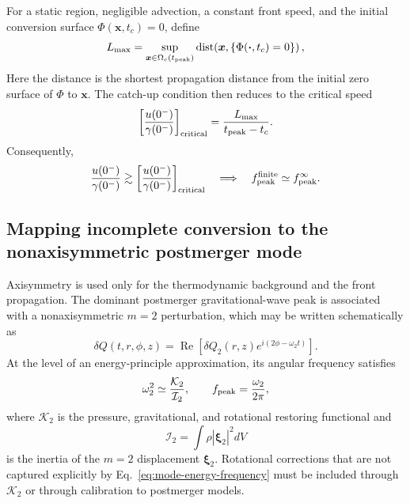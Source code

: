 \documentclass[11pt]{article}
\begin{document}
For a static region, negligible advection, a constant front speed, and the initial conversion surface \(\Phi(\boldsymbol{x},t_c)=0\), define
\begin{equation}
L_{\rm max}
=
\sup_{\boldsymbol{x}\in\Omega_c(t_{\rm peak})}
\operatorname{dist}\!\left(\boldsymbol{x},\{\Phi(\boldsymbol{\cdot},t_c)=0\}\right),
\label{eq:maximum-propagation-distance}
\end{equation}
Here the distance is the shortest propagation distance from the initial zero surface of \(\Phi\) to \(\boldsymbol{x}\).
The catch-up condition then reduces to the critical speed
\begin{equation}
\left[
\frac{u(0^-)}
{\gamma(0^-)}
\right]_{\rm critical}
=
\frac{L_{\rm max}}
{t_{\rm peak}-t_c}.
\label{eq:generic-critical-front-velocity}
\end{equation}
Consequently,
\begin{equation}
\frac{u(0^-)}
{\gamma(0^-)}
\gtrsim
\left[
\frac{u(0^-)}
{\gamma(0^-)}
\right]_{\rm critical}
\quad\Longrightarrow\quad
f_{\rm peak}^{\rm finite}
\simeq
f_{\rm peak}^{\infty}.
\label{eq:generic-frequency-catch-up}
\end{equation}

\subsection{Mapping incomplete conversion to the nonaxisymmetric postmerger mode}
\label{sec:gw-frequency-map}

Axisymmetry is used only for the thermodynamic background and the front propagation.
The dominant postmerger gravitational-wave peak is associated with a nonaxisymmetric \(m=2\) perturbation, which may be written schematically as
\begin{equation}
\delta Q(t,r,\phi,z)
=
\operatorname{Re}
\left[
\delta Q_2(r,z)
e^{i(2\phi-\omega_2 t)}
\right].
\label{eq:m2-perturbation}
\end{equation}
At the level of an energy-principle approximation, its angular frequency satisfies
\begin{equation}
\omega_2^2
\simeq
\frac{\mathcal K_2}{\mathcal I_2},
\qquad
f_{\rm peak}
=
\frac{\omega_2}{2\pi},
\label{eq:mode-energy-frequency}
\end{equation}
where \(\mathcal K_2\) is the pressure, gravitational, and rotational restoring functional and
\begin{equation}
\mathcal I_2
=
\int
\rho
\left|\boldsymbol{\xi}_2\right|^2
dV
\label{eq:m2-mode-inertia}
\end{equation}
is the inertia of the \(m=2\) displacement \(\boldsymbol{\xi}_2\).
Rotational corrections that are not captured explicitly by Eq.~\eqref{eq:mode-energy-frequency} must be included through \(\mathcal K_2\) or through calibration to postmerger models.
\end{document}
